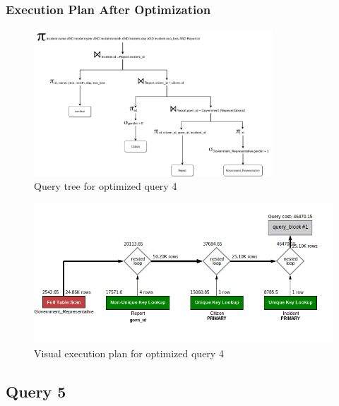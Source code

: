 \subsubsection{Execution Plan After Optimization}
\begin{figure}[H]
    \centering
    \includegraphics[width=0.8\textwidth]{images/query_trees/query4-optimized.png}
    \caption{Query tree for optimized query 4}
\end{figure}
\begin{figure}[H]
    \centering
    \includegraphics[width=\textwidth]{images/execution_plans/q4-2-new.png}
    \caption{Visual execution plan for optimized query 4}
\end{figure}

\subsection{Query 5}

